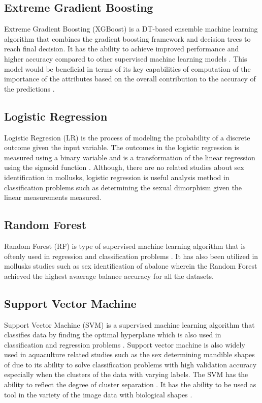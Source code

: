 \subsection{Extreme Gradient Boosting}
Extreme Gradient Boosting (XGBoost) is a DT-based ensemble machine learning algorithm that combines the gradient boosting framework and decision trees to reach final decision. It has the ability to achieve improved performance and higher accuracy compared to other supervised machine learning models . This model would be beneficial in terms of its key capabilities of computation of the importance of the attributes based on the overall contribution to the accuracy of the predictions \cite{torres2023}. 

\subsection{Logistic Regression}

Logistic Regresion (LR) is the process of modeling the probability of a discrete outcome given the input variable. The outcomes in the logistic regression is measured using a binary variable and is a transformation of the linear regression using the sigmoid function \cite{cui2020}. Although, there are no related studies about sex identification in mollusks, logistic regression is useful analysis method in classification problems such as determining the sexual dimorphism given the linear measurements measured. 

\subsection{Random Forest}

Random Forest (RF) is type of supervised machine learning algorithm that is oftenly used in regression and classification problems \cite{cui2020}. It has also been utilized in mollusks studies such as sex identification of abalone wherein the Random Forest achieved the highest avaerage balance accuracy for all the datasets\cite{arifin2021}.

\subsection{Support Vector Machine}

Support Vector Machine (SVM) is a supervised machine learning algorithm that classifies data by finding the optimal hyperplane which is also used in classification and regression problems \cite{cui2020}. Support vector machine is also widely used in aquaculture related studies such as the sex determining mandible shapes of due to its ability to solve classification problems with high validation accuracy especially when the clusters of the data with varying labels. The SVM has the ability to reflect the degree of cluster separation . It has the ability to be used as tool in the variety of the image data with biological shapes \cite{tsutsumi2023}.

